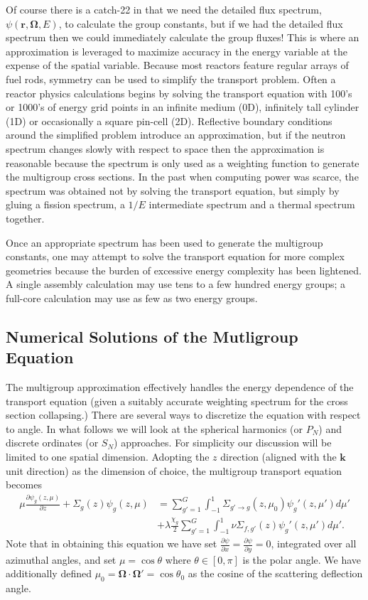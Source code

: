 \documentclass[11pt]{article}
\renewcommand\vec{\mathbf}
\begin{document}
Of course there is a catch-22 in that we need the detailed flux spectrum, \(\psi(\vec{r},\vec{\Omega},E)\), to calculate the group constants, but if we had the detailed flux spectrum then we could immediately calculate the group fluxes!  This is where an approximation is leveraged to maximize accuracy in the energy variable at the expense of the spatial variable.  Because most reactors feature regular arrays of fuel rods, symmetry can be used to simplify the transport problem.  Often a reactor physics calculations begins by solving the transport equation with 100's or 1000's of energy grid points in an infinite medium (0D), infinitely tall cylinder (1D) or occasionally a square pin-cell (2D).  Reflective boundary conditions around the simplified problem introduce an approximation, but if the neutron spectrum changes slowly with respect to space then the approximation is reasonable because the spectrum is only used as a weighting function to generate the multigroup cross sections.  In the past when computing power was scarce, the spectrum was obtained not by solving the transport equation, but simply by gluing a fission spectrum, a \(1/E\) intermediate spectrum and a thermal spectrum together.

Once an appropriate spectrum has been used to generate the multigroup constants, one may attempt to solve the transport equation for more complex geometries because the burden of excessive energy complexity has been lightened.  A single assembly calculation may use tens to a few hundred energy groups; a full-core calculation may use as few as two energy groups.

\subsection{Numerical Solutions of the Mutligroup Equation}
\label{sec:orgheadline56}
The multigroup approximation effectively handles the energy dependence of the transport equation (given a suitably accurate weighting spectrum for the cross section collapsing.)  There are several ways to discretize the equation with respect to angle.  In what follows we will look at the spherical harmonics (or \(P_N\)) and discrete ordinates (or \(S_N\)) approaches.  For simplicity our discussion will be limited to one spatial dimension.  Adopting the \(z\) direction (aligned with the \(\vec{k}\) unit direction) as the dimension of choice, the multigroup transport equation becomes
\begin{align}
  \mu \frac{\partial \psi_g(z,\mu)}{\partial z}
  + \Sigma_g(z) \psi_g(z,\mu)
  &= \sum_{g'=1}^G \int_{-1}^1 \Sigma_{g'\rightarrow g}(z, \mu_0) \psi_g'(z,\mu') d\mu' \\
  &+ \lambda\frac{\chi_g}{2} \sum_{g'=1}^G \int_{-1}^1 \nu\Sigma_{f,g'}(z) \psi_g'(z,\mu') d\mu'.
  \label{eq::1dMgTransportEqn}
\end{align}
Note that in obtaining this equation we have set \(\frac{\partial \psi}{\partial x} = \frac{\partial \psi}{\partial y} = 0\), integrated over all azimuthal angles, and set \(\mu=\cos\theta\) where \(\theta \in [0,\pi]\) is the polar angle.  We have additionally defined \(\mu_0 = \vec{\Omega}\cdot\vec{\Omega}' = \cos\theta_0\) as the cosine of the scattering deflection angle.
\end{document}
